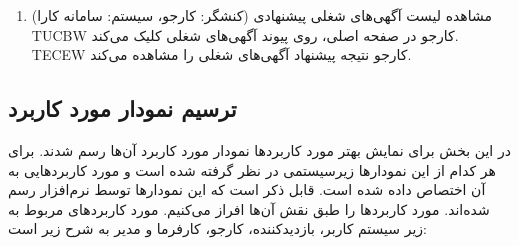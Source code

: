 \documentclass[12pt]{article}
\begin{document}
\begin{enumerate}
		\item
		مشاهده لیست آگهی‌های شغلی پیشنهادی (کنشگر: کارجو، سیستم: سامانه کارا)\\
		TUCBW کارجو در صفحه اصلی، روی پیوند آگهی‌های شغلی کلیک می‌کند.\\
		TECEW کارجو نتیجه پیشنهاد آگهی‌های شغلی را مشاهده می‌کند.\\
	\end{enumerate}

	\subsection{ترسیم نمودار مورد کاربرد}
	در این بخش برای نمایش بهتر مورد کاربردها نمودار مورد کاربرد آن‌ها رسم شدند. برای هر کدام از این نمودارها زیرسیستمی در نظر گرفته شده است و مورد کاربرد‌هایی به آن اختصاص داده شده است. قابل ذکر است که این نمودارها توسط نرم‌افزار
	 رسم شده‌اند. مورد کاربرد‌ها را طبق نقش آن‌ها افراز می‌کنیم. مورد کاربردهای مربوط به زیر سیستم کاربر، بازدیدکننده، کارجو، کارفرما و مدیر به شرح زیر است:
\end{document}
